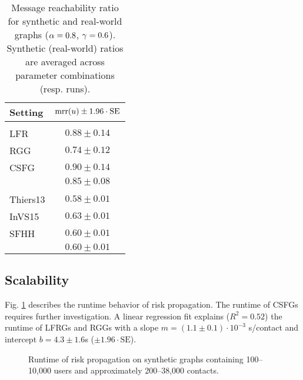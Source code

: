 \begin{table}[htbp]
	\centering
	\begin{tabular}{lc}
		\toprule
		\bfseries Setting & $\operatorname{mrr}(u) \pm 1.96 \cdot \text{SE}$\\
		\midrule
		\rowgroup{\itshape Synthetic} \\
		LFR & $0.88 \pm 0.14$\\
		RGG & $0.74 \pm 0.12$\\
		CSFG & $0.90 \pm 0.14$\\
		& $\boldsymbol{0.85 \pm 0.08}$ \\
		\midrule
		\rowgroup{\itshape Real-world} \\
		Thiers13 & $0.58 \pm 0.01$\\
		InVS15 & $0.63 \pm 0.01$\\
		SFHH & $0.60 \pm 0.01$\\
		& $\boldsymbol{0.60 \pm 0.01}$ \\
		\bottomrule
	\end{tabular}
	\caption[Message reachability ratio for synthetic and real-world graphs]{Message reachability ratio for synthetic and real-world graphs ($\alpha = 0.8$, $\gamma = 0.6$). Synthetic (real-world) ratios are averaged across parameter combinations (resp. runs).}
	\label{tab:reachability}
\end{table}

\subsection{Scalability}

Fig. \ref{fig:runtime} describes the runtime behavior of risk propagation. The runtime of CSFGs requires further investigation. A linear regression fit explains ($R^2 = 0.52$) the runtime of LFRGs and RGGs with a slope $m = (1.1 \pm 0.1) \cdot 10^{-3}$ s/contact and intercept $b = 4.3 \pm 1.6$s ($\pm 1.96 \cdot \text{SE}$).

\begin{figure}[htbp]
	\centering
	\caption[Runtime of risk propagation]{Runtime of risk propagation on synthetic graphs containing 100--10,000 users and approximately 200--38,000 contacts.}
	\label{fig:runtime}
\end{figure}

